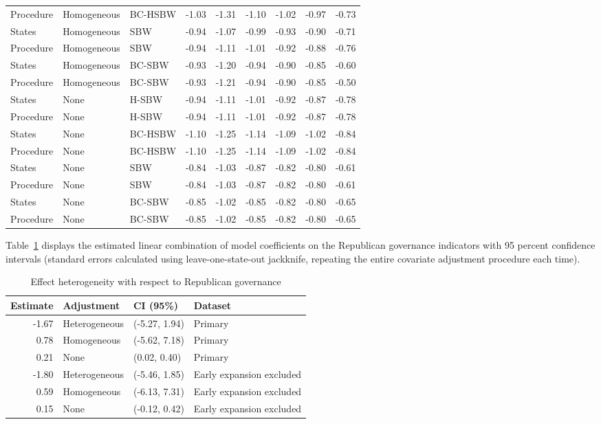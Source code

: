 \begin{table}[ht]
\begin{tabular}{lllrrrrrr}
  Procedure & Homogeneous & BC-HSBW & -1.03 & -1.31 & -1.10 & -1.02 & -0.97 & -0.73 \\ 
  States & Homogeneous & SBW & -0.94 & -1.07 & -0.99 & -0.93 & -0.90 & -0.71 \\ 
  Procedure & Homogeneous & SBW & -0.94 & -1.11 & -1.01 & -0.92 & -0.88 & -0.76 \\ 
  States & Homogeneous & BC-SBW & -0.93 & -1.20 & -0.94 & -0.90 & -0.85 & -0.60 \\ 
  Procedure & Homogeneous & BC-SBW & -0.93 & -1.21 & -0.94 & -0.90 & -0.85 & -0.50 \\ 
  States & None & H-SBW & -0.94 & -1.11 & -1.01 & -0.92 & -0.87 & -0.78 \\ 
  Procedure & None & H-SBW & -0.94 & -1.11 & -1.01 & -0.92 & -0.87 & -0.78 \\ 
  States & None & BC-HSBW & -1.10 & -1.25 & -1.14 & -1.09 & -1.02 & -0.84 \\ 
  Procedure & None & BC-HSBW & -1.10 & -1.25 & -1.14 & -1.09 & -1.02 & -0.84 \\ 
  States & None & SBW & -0.84 & -1.03 & -0.87 & -0.82 & -0.80 & -0.61 \\ 
  Procedure & None & SBW & -0.84 & -1.03 & -0.87 & -0.82 & -0.80 & -0.61 \\ 
  States & None & BC-SBW & -0.85 & -1.02 & -0.85 & -0.82 & -0.80 & -0.65 \\ 
  Procedure & None & BC-SBW & -0.85 & -1.02 & -0.85 & -0.82 & -0.80 & -0.65 \\ 
   \hline
\end{tabular}
\end{table}

Table~\ref{tab:hte} displays the estimated linear combination of model coefficients on the Republican governance indicators with 95 percent confidence intervals (standard errors calculated using leave-one-state-out jackknife, repeating the entire covariate adjustment procedure each time). 

\begin{table}[ht]
\caption{Effect heterogeneity with respect to Republican governance}
\label{tab:hte}
\centering
\begin{tabular}{rlll}
  \hline
Estimate & Adjustment & CI (95\%) & Dataset \\ 
  \hline
-1.67 & Heterogeneous & (-5.27, 1.94) & Primary \\ 
  0.78 & Homogeneous & (-5.62, 7.18) & Primary \\ 
  0.21 & None & (0.02, 0.40) & Primary \\ 
  -1.80 & Heterogeneous & (-5.46, 1.85) & Early expansion excluded \\ 
  0.59 & Homogeneous & (-6.13, 7.31) & Early expansion excluded \\ 
  0.15 & None & (-0.12, 0.42) & Early expansion excluded \\ 
   \hline
\end{tabular}
\end{table}
